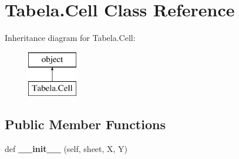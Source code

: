 \hypertarget{class_tabela_1_1_cell}{}\section{Tabela.\+Cell Class Reference}
\label{class_tabela_1_1_cell}
Inheritance diagram for Tabela.\+Cell\+:\begin{figure}[H]
\begin{center}
\leavevmode
\includegraphics[height=2.000000cm]{class_tabela_1_1_cell}
\end{center}
\end{figure}
\subsection*{Public Member Functions}
\begin{DoxyCompactItemize}
\item 
\mbox{\label{class_tabela_1_1_cell_a0cc729a89011b7ebd701ca6f1405f122}} 
def {\bfseries \+\_\+\+\_\+init\+\_\+\+\_\+} (self, sheet, X, Y)
\end{DoxyCompactItemize}
